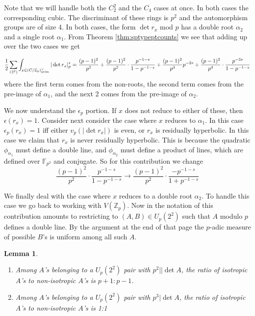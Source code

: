 \documentclass{article}
\def\Z{{\mathbb Z}}
\def\prim{{\rm prim}}
\def\F{{\mathbb F}}
\def\Z{{\mathbb Z}}
\def\F{{\mathbb F}}
\newtheorem{lemma}[theorem]{Lemma}
\begin{document}
Note that we will handle both the $C_2^2$ and the $C_4$ cases at once. In both cases the corresponding cubic.
The discriminant of these rings is $p^2$ and the automorphism groups are of size 4. In both cases, the form $\det{r_x}$ mod $p$ has a double root $\alpha_2$ and a single root $\alpha_1$. 
From Theorem \ref{thm:sptypeptcounts} we see that adding up over the two cases we get

$$\frac12\sum_{(2^2)}\int_{x\in (C/\Z_p)^{\vee}_{\prim}}  |\det{r_x}|_p^{s} = \frac{(p-1)^2}{p^2} + \frac{(p-1)^2}{p^2}\cdot \frac{p^{-1-s}}{1-p^{-1-s}} + \frac{(p-1)^2}{p^3}p^{-2s}+ \frac{(p-1)^2}{p^4}\cdot\frac{p^{-3s}}{1-p^{-1-s}}$$
where the first term comes from the non-roots, the second term comes from the pre-image of $\alpha_1$, and the next 2 comes from the pre-image of $\alpha_2$.

We now understand the $\epsilon_p$ portion. If $x$ does not  reduce to either of these, then $\epsilon(r_x)=1$. 
Consider next consider the case where $x$ reduces to $\alpha_1$.  In this case $\epsilon_p(r_x)=1$ iff either $v_p(|\det r_x|)$ is even, or $r_x$ is residually hyperbolic.  In this case we claim that $r_x$ is never residually hyperbolic. This is because the quadratic $\phi_{\alpha_1}$ must define a double line, and $\phi_{\alpha_2}$ must define a product of lines, which are defined over $\F_{p^2}$ and conjugate. So for this contribution we change 
$$\frac{(p-1)^2}{p^2}\cdot \frac{p^{-1-s}}{1-p^{-1-s}}\longrightarrow \frac{(p-1)^2}{p^2}\cdot \frac{-p^{-1-s}}{1+p^{-1-s}}$$

We finally deal with the case where $x$ reduces to a double root $\alpha_2$. To handle this case we go back to working with $V(\Z_p)$. Now in the notation of \cite[p.1358]{BHCL3} this contribution amounts to restricting to $(A,B)\in U_p(2^2)$ such that $A$ modulo $p$ defines a double line. By the argument at the end of that page the $p$-adic measure of possible $B$'s is uniform among all such $A$. 

\begin{lemma}\label{lem:type2^2isotropy}
\begin{enumerate}
    \item Among $A$'s belonging to a $U_p(2^2)$ pair with $p^2 || \det A$, the ratio of isotropic $A$'s to non-isotropic $A$'s is $p+1 : p-1$.
    \item Among $A$'s belonging to a $U_p(2^2)$ pair with $p^3 | \det A$, the ratio of isotropic $A$'s to non-isotropic $A$'s is 1:1
\end{enumerate} 
\end{lemma}
\end{document}
